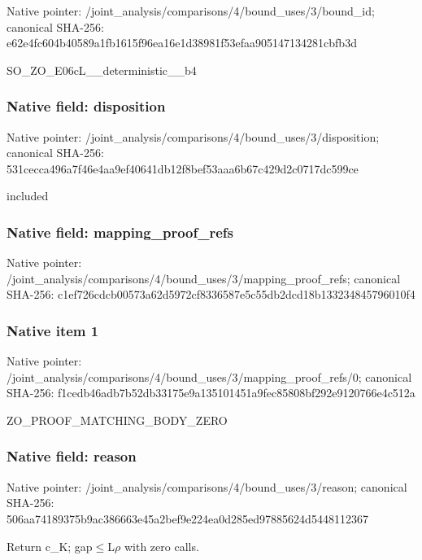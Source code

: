 \documentclass[10pt,a4paper]{article}
\begin{document}
Native pointer: /joint\_analysis/comparis\allowbreak{}ons/4/bound\_uses/3/bound\allowbreak{}\_id; canonical SHA-256: e62e4fc604b40589a1fb1615\allowbreak{}f96ea16e1d38981f53efaa90\allowbreak{}5147134281cbfb3d


SO\_ZO\_E06cL\_\_deterministic\_\_b4


\subsubsection{Native field: disposition}


Native pointer: /joint\_analysis/comparis\allowbreak{}ons/4/bound\_uses/3/dispo\allowbreak{}sition; canonical SHA-256: 531cecca496a7f46e4aa9ef4\allowbreak{}0641db12f8bef53aaa6b67c4\allowbreak{}29d2c0717dc599ce


included


\subsubsection{Native field: mapping\_proof\_refs}


Native pointer: /joint\_analysis/comparis\allowbreak{}ons/4/bound\_uses/3/mappi\allowbreak{}ng\_proof\_refs; canonical SHA-256: c1ef726cdcb00573a62d5972\allowbreak{}cf8336587e5c55db2dcd18b1\allowbreak{}33234845796010f4



\subsubsection{Native item 1}


Native pointer: /joint\_analysis/comparis\allowbreak{}ons/4/bound\_uses/3/mappi\allowbreak{}ng\_proof\_refs/0; canonical SHA-256: f1cedb46adb7b52db33175e9\allowbreak{}a135101451a9fec85808bf29\allowbreak{}2e9120766e4c512a


ZO\_PROOF\_MATCHING\_BODY\_ZERO


\subsubsection{Native field: reason}


Native pointer: /joint\_analysis/comparis\allowbreak{}ons/4/bound\_uses/3/reaso\allowbreak{}n; canonical SHA-256: 506aa74189375b9ac386663e\allowbreak{}45a2bef9e224ea0d285ed978\allowbreak{}85624d5448112367


Return c\_K; gap\ensuremath{\le}L\ensuremath{\rho} with zero calls.
\end{document}
